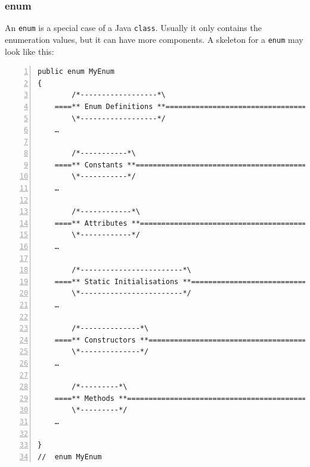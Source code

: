\documentclass[12pt,a4paper,titlepage, parskip=half, headsepline, footsepline, cleardoubleplain]{scrbook}
\begin{document}
\subsubsection{enum}
An \lstinline|enum| is a special case of a Java \lstinline|class|. Usually it only contains the enumeration values, but it can have more components. A skeleton for a \lstinline|enum| may look like this:
\begin{lstlisting}[numbers=left,caption={enum Skeleton}]
public enum MyEnum 
{
        /*------------------*\
    ====** Enum Definitions **=======================================
        \*------------------*/
    …
        
        /*-----------*\
    ====** Constants **==============================================
        \*-----------*/
    …
        
        /*------------*\
    ====** Attributes **=============================================
        \*------------*/
    …
        
        /*------------------------*\
    ====** Static Initialisations **=================================
        \*------------------------*/
    …
        
        /*--------------*\
    ====** Constructors **===========================================
        \*--------------*/
    …
        
        /*---------*\
    ====** Methods **================================================
        \*---------*/
    …
                
}
//  enum MyEnum
\end{lstlisting}
 
\end{document}
